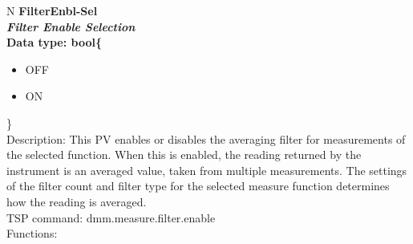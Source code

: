 \documentclass[openany]{article}
\begin{document}
		\begin{tabular}{N}
			\hline
			\bfseries FilterEnbl-Sel\label{pv:filterenbl-sel} \\ \hline
			\emph{Filter Enable Selection} \\
			Data type: bool\{\begin{itemize}[noitemsep]
				\item[] OFF
				\item[] ON
			\end{itemize}\} \\
			Description: This PV enables or disables the averaging filter for measurements of the selected function. When this is enabled, the reading returned by the instrument is an averaged value, taken from multiple measurements. The settings of the filter count and filter type for the selected measure function determines how the reading is averaged. \\
			TSP command: dmm.measure.filter.enable \\
			Functions: \\
			\arrayrulecolor{\FuncTableBorderColor}

		\end{tabular}
\end{document}
